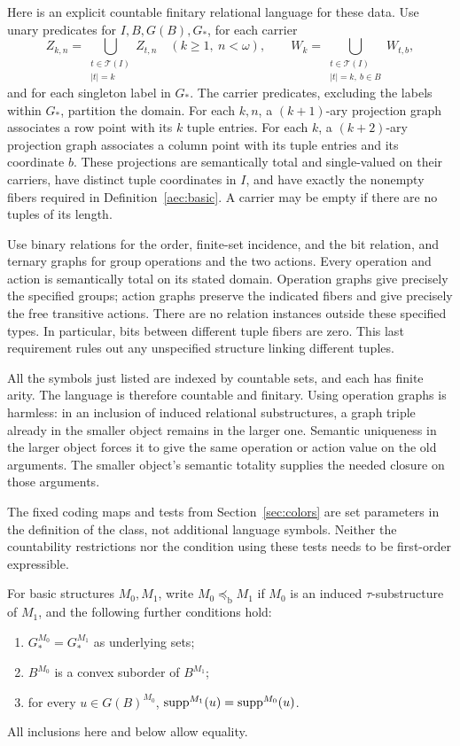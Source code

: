Here is an explicit countable finitary relational language for these
data.  Use unary predicates for \(I,B,G(B),G_*\), for each carrier
\[
 Z_{k,n}=\bigcup_{\substack{t\in\mathcal T(I)\\|t|=k}}Z_{t,n}
 \quad(k\ge1,\ n<\omega),
 \qquad
 W_k=\bigcup_{\substack{t\in\mathcal T(I)\\|t|=k,\ b\in B}}W_{t,b},
\]
and for each singleton label in \(G_*\).  The carrier predicates,
excluding the labels within \(G_*\), partition the domain.
For each \(k,n\), a \((k+1)\)-ary projection graph associates a
row point with its \(k\) tuple entries.  For each \(k\), a
\((k+2)\)-ary projection graph associates a column point with its
tuple entries and its coordinate \(b\).  These projections are
semantically total and single-valued on their carriers, have distinct
tuple coordinates in \(I\), and have exactly the nonempty fibers
required in Definition~\ref{aec:basic}.  A carrier may be empty if
there are no tuples of its length.

Use binary relations for the order, finite-set incidence, and the
bit relation, and ternary graphs for group operations and the two
actions.  Every operation and action is semantically total on its
stated domain.  Operation graphs give precisely the specified groups;
action graphs preserve the indicated fibers and give precisely the
free transitive actions.  There are no relation instances outside
these specified types.  In particular, bits between different tuple
fibers are zero.  This last requirement rules out any unspecified
structure linking different tuples.

All the symbols just listed are indexed by countable sets, and each
has finite arity.  The language is therefore countable and finitary.
Using operation graphs is harmless: in an inclusion of induced
relational substructures, a graph triple already in the smaller
object remains in the larger one.  Semantic uniqueness in the larger
object forces it to give the same operation or action value on the
old arguments.  The smaller object's semantic totality supplies the
needed closure on those arguments.

The fixed coding maps and tests from Section~\ref{sec:colors} are set
parameters in the definition of the class, not additional language
symbols.  Neither the countability restrictions nor the condition
using these tests needs to be first-order expressible.

\begin{definition}\label{aec:basic-inclusion}
For basic structures \(M_0,M_1\), write
\(M_0\preccurlyeq_{\mathrm b}M_1\) if \(M_0\) is an induced
\(\tau\)-substructure of \(M_1\), and the following further conditions
hold:
\begin{enumerate}[label=\textup{(\roman*)}]
\item \(G_*^{M_0}=G_*^{M_1}\) as underlying sets;
\item \(B^{M_0}\) is a convex suborder of \(B^{M_1}\);
\item for every \(u\in G(B)^{M_0}\),
\(\operatorname{supp}^{M_1}(u)=\operatorname{supp}^{M_0}(u)\).
\end{enumerate}
All inclusions here and below allow equality.
\end{definition}

